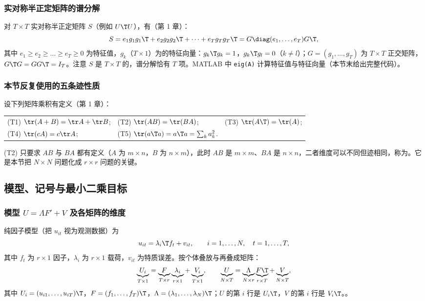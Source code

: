 \subsubsection{实对称半正定矩阵的谱分解}

对 $T\times T$ 实对称半正定矩阵 $S$（例如 $U\T U$），有（第 1 章）：
\begin{equation}\label{eq:U13b-spectral}
S=e_1g_1g_1\T+e_2g_2g_2\T+\dots+e_Tg_Tg_T\T=G\diag(e_1,\dots,e_T)G\T,
\end{equation}
其中 $e_1\ge e_2\ge\dots\ge e_T\ge 0$ 为特征值，$g_k$（$T\times1$）为的特征向量：$g_k\T g_k=1$，$g_k\T g_l=0$（$k\neq l$）；$G=(g_1,\dots,g_T)$ 为 $T\times T$ 正交矩阵，$G\T G=GG\T=I_T$。注意 $S$ 是 $T\times T$ 的，谱分解恰有 $T$ 项。MATLAB 中 \texttt{eig(A)} 计算特征值与特征向量（本节末给出完整代码）。

\subsubsection{本节反复使用的五条迹性质}

设下列矩阵乘积有定义（第 1 章）：
\begin{center}
\begin{tabular}{lll}
(T1) $\tr(A+B)=\tr A+\tr B$; & (T2) $\tr(AB)=\tr(BA)$; & (T3) $\tr(A\T)=\tr(A)$;\\[2pt]
(T4) $\tr(cA)=c\tr A$; & (T5) $\tr(a\T a)=a\T a=\sum_k a_k^2$. &
\end{tabular}
\end{center}
(T2) 只要求 $AB$ 与 $BA$ 都有定义（$A$ 为 $m\times n$，$B$ 为 $n\times m$），此时 $AB$ 是 $m\times m$、$BA$ 是 $n\times n$，二者维度可以不同但迹相同，称为。它是本节把 $N\times N$ 问题化成 $r\times r$ 问题的关键。

\subsection{模型、记号与最小二乘目标}

\subsubsection{模型 \texorpdfstring{$U=\Lambda F'+V$}{U = Lambda F' + V} 及各矩阵的维度}

纯因子模型（把 $u_{it}$ 视为观测数据）为
\[
u_{it}=\lambda_i\T f_t+v_{it},\qquad i=1,\dots,N,\quad t=1,\dots,T,
\]
其中 $f_t$ 为 $r\times 1$ 因子，$\lambda_i$ 为 $r\times1$ 载荷，$v_{it}$ 为特质误差。按个体叠放与再叠成矩阵：
\[
\underbrace{U_i}_{T\times1}=\underbrace{F}_{T\times r}\underbrace{\lambda_i}_{r\times 1}+\underbrace{V_i}_{T\times1},
\qquad
\underbrace{U}_{N\times T}=\underbrace{\Lambda}_{N\times r}\underbrace{F\T}_{r\times T}+\underbrace{V}_{N\times T},
\]
其中 $U_i=(u_{i1},\dots,u_{iT})\T$，$F=(f_1,\dots,f_T)\T$，$\Lambda=(\lambda_1,\dots,\lambda_N)\T$；$U$ 的第 $i$ 行是 $U_i\T$，$V$ 的第 $i$ 行是 $V_i\T$。。

